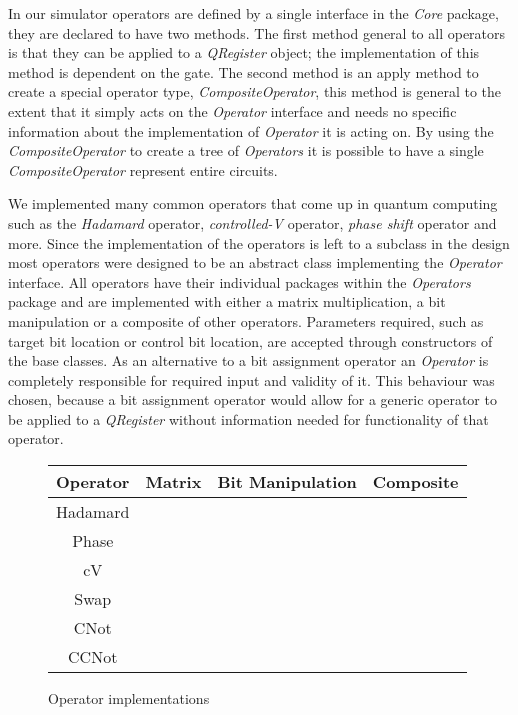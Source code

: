 In our simulator operators are defined by a single interface in the \emph{Core} package, they are declared to have two methods. The first method general to all operators is that they can be applied to a \emph{QRegister} object; the implementation of this method is dependent on the gate. The second method is an apply method to create a special operator type, \emph{CompositeOperator}, this method is general to the extent that it simply acts on the \emph{Operator} interface and needs no specific information about the implementation of \emph{Operator} it is acting on. By using the \emph{CompositeOperator} to create a tree of \emph{Operators} it is possible to have a single \emph{CompositeOperator} represent entire circuits.

We implemented many common operators that come up in quantum computing such as the \emph{Hadamard} operator, \emph{controlled-V} operator, \emph{phase shift} operator and more. Since the implementation of the operators is left to a subclass in the design most operators were designed to be an abstract class implementing the \emph{Operator} interface. All operators have their individual packages within the \emph{Operators} package and are implemented with either a matrix multiplication, a bit manipulation or a composite of other operators. Parameters required, such as target bit location or control bit location, are accepted through constructors of the base classes. As an alternative to a bit assignment operator an \emph{Operator} is completely responsible for required input and validity of it. This behaviour was chosen, because a bit assignment operator would allow for a generic operator to be applied to a \emph{QRegister} without information needed for functionality of that operator.

\begin{figure}
	\centering

	\begin{tabular}{ | c || c | c | c | }
		\hline
		Operator & Matrix & Bit Manipulation & Composite \\
		\hline
		\hline
		Hadamard & \checkmark & \checkmark & \\
		\hline
		Phase & \checkmark & \checkmark & \\
		\hline
		cV & \checkmark & \checkmark & \\
		\hline
		Swap &  & \checkmark & \\
		\hline
		CNot & \checkmark & \checkmark &  \checkmark \\
		\hline
		CCNot & & & \checkmark \\
		\hline
	\end{tabular}

	\caption{ Operator implementations }	
\end{figure}

